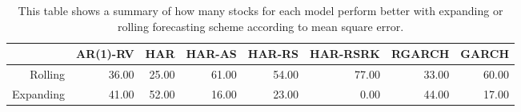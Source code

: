 \begin{table}[ht]
\centering
\begin{tabular}{rrrrrrrr}
  \hline
 & AR(1)-RV & HAR & HAR-AS & HAR-RS & HAR-RSRK & RGARCH & GARCH \\ 
  \hline
Rolling & 36.00 & 25.00 & 61.00 & 54.00 & 77.00 & 33.00 & 60.00 \\ 
  Expanding & 41.00 & 52.00 & 16.00 & 23.00 & 0.00 & 44.00 & 17.00 \\ 
   \hline
\end{tabular}
\caption[Better scheme MSE summary]{This table shows a summary of how many stocks for each model perform better with expanding or rolling forecasting scheme according to mean square error. } 
\label{Table:Better_MSE_summary}
\end{table}
